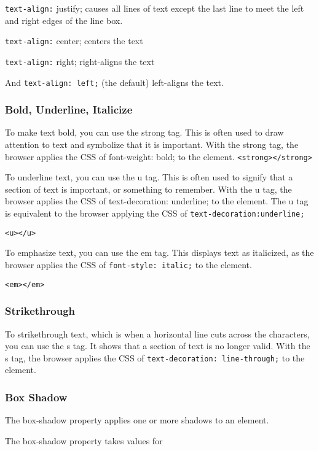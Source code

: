 \texttt{text-align:} justify; causes all lines of text except the last line to meet the left and right edges of the line box.

\texttt{text-align:} center; centers the text

\texttt{text-align:} right; right-aligns the text

And \texttt{text-align: left;} (the default) left-aligns the text.

\subsubsection{Bold, Underline, Italicize}
To make text bold, you can use the strong tag. This is often used to draw attention to text and symbolize that it is important. With the strong tag, the browser applies the CSS of font-weight: bold; to the element.
\texttt{<strong></strong>}

To underline text, you can use the u tag. This is often used to signify that a section of text is important, or something to remember. With the u tag, the browser applies the CSS of text-decoration: underline; to the element. The u tag is equivalent to the browser applying the CSS of \texttt{text-decoration:underline;}

\texttt{<u></u>}

To emphasize text, you can use the em tag. This displays text as italicized, as the browser applies the CSS of \texttt{font-style: italic;} to the element.

\texttt{<em></em>}

\subsubsection{Strikethrough}
To strikethrough text, which is when a horizontal line cuts across the characters, you can use the s tag. It shows that a section of text is no longer valid. With the s tag, the browser applies the CSS of \texttt{text-decoration: line-through;} to the element.

\subsubsection{Box Shadow}


The box-shadow property applies one or more shadows to an element.

The box-shadow property takes values for

